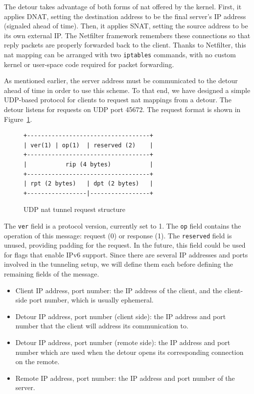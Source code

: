 \documentclass{cwru}
\begin{document}
The detour takes advantage of both forms of \ac{nat} offered by the kernel.
First, it applies DNAT, setting the destination address to be the final server's
IP address (signaled ahead of time). Then, it applies SNAT, setting the source
address to be its own external IP. The Netfilter framework remembers these
connections so that reply packets are properly forwarded back to the client.
Thanks to Netfilter, this \ac{nat} mapping can be arranged with two
\texttt{iptables} commands, with no custom kernel or user-space code required
for packet forwarding.

As mentioned earlier, the server address must be communicated to the detour
ahead of time in order to use this scheme. To that end, we have designed a
simple UDP-based protocol for clients to request \ac{nat} mappings from a
detour. The detour listens for requests on UDP port 45672. The request format is
shown in Figure~\ref{fig:udp-nat-packet}.

\begin{figure}
  \centering
\begin{BVerbatim}
+-----------------------------------+
| ver(1) | op(1)  | reserved (2)    |
+-----------------------------------+
|           rip (4 bytes)           |
+-----------------------------------+
| rpt (2 bytes)   | dpt (2 bytes)   |
+-----------------|-----------------+
\end{BVerbatim}
  \caption{UDP \ac{nat} tunnel request structure}
  \label{fig:udp-nat-packet}
\end{figure}

The \texttt{ver} field is a protocol version, currently set to 1. The
\texttt{op} field contains the operation of this message: request (0) or
response (1). The \texttt{reserved} field is unused, providing padding for the
request. In the future, this field could be used for flags that enable IPv6
support. Since there are several IP addresses and ports involved in the
tunneling setup, we will define them each before defining the remaining fields
of the message.

\begin{itemize}
\item Client IP address, port number: the IP address of the client, and the
  client-side port number, which is usually ephemeral.
\item Detour IP address, port number (client side): the IP address and port
  number that the client will address its communication to.
\item Detour IP address, port number (remote side): the IP address and port
  number which are used when the detour opens its corresponding connection on
  the remote.
\item Remote IP address, port number: the IP address and port number of the
  server.
\end{itemize}
\end{document}
